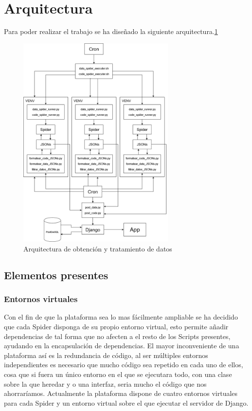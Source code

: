 \section{Arquitectura}
Para poder realizar el trabajo se ha diseñado la siguiente arquitectura.\ref{fig:ej7}
\begin{figure} [h]
	\centering
	\includegraphics[width=0.7\textwidth]{fig/arquitectura.png}
	\caption[Arquitectura de obtención y tratamiento de datos]{Arquitectura de obtención y tratamiento de datos}
	\label{fig:ej7}
\end{figure}

\subsection{Elementos presentes}

\subsubsection{Entornos virtuales}
Con el fin de que la plataforma sea lo mas fácilmente ampliable se ha decidido que cada Spider disponga de su propio entorno virtual, esto permite añadir dependencias de tal forma que no afecten a el resto de los Scripts presentes, ayudando en la encapsulación de dependencias.\newline
El mayor inconveniente de una plataforma así es la redundancia de código, al ser múltiples entornos independientes es necesario que mucho código sea repetido en cada uno de ellos, cosa que si fuera un único entorno en el que se ejecutara todo, con una clase sobre la que heredar y o una interfaz, seria mucho el código que nos ahorraríamos.\newline
Actualmente la plataforma dispone de cuatro entornos virtuales para cada Spider y un entorno virtual sobre el que ejecutar el servidor de Django.

